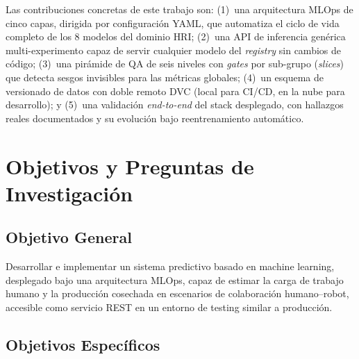 \documentclass[conference]{IEEEtran}
\begin{document}
Las contribuciones concretas de este trabajo son: (1)~una arquitectura MLOps de cinco capas, dirigida por configuración YAML, que automatiza el ciclo de vida completo de los 8 modelos del dominio HRI; (2)~una API de inferencia genérica multi-experimento capaz de servir cualquier modelo del \textit{registry} sin cambios de código; (3)~una pirámide de QA de seis niveles con \textit{gates} por sub-grupo (\textit{slices}) que detecta sesgos invisibles para las métricas globales; (4)~un esquema de versionado de datos con doble remoto DVC (local para CI/CD, en la nube para desarrollo); y (5)~una validación \textit{end-to-end} del stack desplegado, con hallazgos reales documentados y su evolución bajo reentrenamiento automático.

\section{Objetivos y Preguntas de Investigación}

\subsection{Objetivo General}

Desarrollar e implementar un sistema predictivo basado en machine learning, desplegado bajo una arquitectura MLOps, capaz de estimar la carga de trabajo humano y la producción cosechada en escenarios de colaboración humano--robot, accesible como servicio REST en un entorno de testing similar a producción.

\subsection{Objetivos Específicos}
\end{document}
